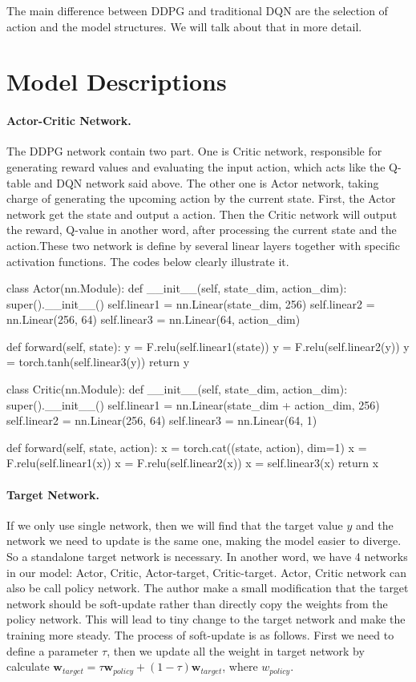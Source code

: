 \documentclass[a4paper,12pt,oneside,article]{memoir}
\newcommand{\mybold}[1]{\paragraph{#1.}} %
\begin{document}
The main difference between DDPG and traditional DQN are the selection of action and the model structures. We will talk about that in more detail.

\section{Model Descriptions}
\mybold{Actor-Critic Network}
The DDPG network contain two part. One is Critic network, responsible for generating reward values and evaluating the input action, which acts like the Q-table and DQN network said above. The other one is Actor network, taking charge of generating the upcoming action by the current state. First, the Actor network get the state and output a action. Then the Critic network will output the reward, Q-value in another word, after processing the current state and the action.These two network is define by several linear layers together with specific activation functions. The codes below clearly illustrate it.

\begin{python}
class Actor(nn.Module):
    def __init__(self, state_dim, action_dim):
        super().__init__()
        self.linear1 = nn.Linear(state_dim, 256)
        self.linear2 = nn.Linear(256, 64)
        self.linear3 = nn.Linear(64, action_dim)

    def forward(self, state):
        y = F.relu(self.linear1(state))
        y = F.relu(self.linear2(y))
        y = torch.tanh(self.linear3(y))
        return y

class Critic(nn.Module):
    def __init__(self, state_dim, action_dim):
        super().__init__()
        self.linear1 = nn.Linear(state_dim + action_dim, 256)
        self.linear2 = nn.Linear(256, 64)
        self.linear3 = nn.Linear(64, 1)

    def forward(self, state, action):
        x = torch.cat((state, action), dim=1)
        x = F.relu(self.linear1(x))
        x = F.relu(self.linear2(x))
        x = self.linear3(x)
        return x
\end{python}

\mybold{Target Network}
If we only use single network, then we will find that the target value $y$ and the network we need to update is the same one, making the model easier to diverge. So a standalone target network is necessary. In another word, we have 4 networks in our model: Actor, Critic, Actor-target, Critic-target. Actor, Critic network can also be call policy network. The author make a small modification that the target network should be soft-update rather than directly copy the weights from the policy network. This will lead to tiny change to the target network and make the training more steady. The process of soft-update is as follows. First we need to define a parameter $\tau$, then we update all the weight in target network by calculate $\bm{w}_{target} = \tau \bm{w}_{policy} + (1 - \tau) \bm{w}_{target}$, where $w_{policy}$.
\end{document}
